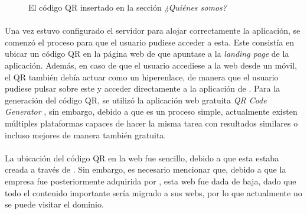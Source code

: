 \documentclass{subfiles}
\begin{document}
    \begin{figure}%
    \centering
    \caption{El código QR insertado en la sección \textit{¿Quiénes somos?}}
    \label{fig:5.1_qr_web}
    \end{figure}

    \paragraph{}
    Una vez estuvo configurado el servidor para alojar correctamente la aplicación, se comenzó el proceso para que el usuario pudiese acceder a esta. Este consistía en ubicar un código QR en la página web de \silverstorm que apuntase a la \textit{landing page} de la aplicación. Además, en caso de que el usuario accediese a la web desde un móvil, el QR también debía actuar como un hiperenlace, de manera que el usuario pudiese pulsar sobre este y acceder directamente a la aplicación de \ra. Para la generación del código QR, se utilizó la aplicación web gratuita \textit{QR Code Generator} \cite{web:qrcodegenerator}, sin embargo, debido a que es un proceso simple, actualmente existen múltiples plataformas capaces de hacer la misma tarea con resultados similares o incluso mejores de manera también gratuita.

    \paragraph{}
    La ubicación del código QR en la web fue sencillo, debido a que esta estaba creada a través de \wordpress. Sin embargo, es necesario mencionar que, debido a que la empresa fue posteriormente adquirida por \thirdera, esta web fue dada de baja, dado que todo el contenido importante sería migrado a sus webs, por lo que actualmente no se puede visitar el dominio.
\end{document}
